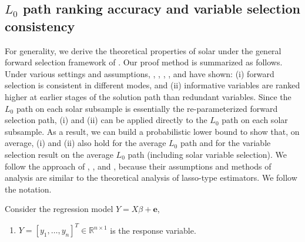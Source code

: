\documentclass[11pt,review,authoryear]{elsarticle}
\begin{document}
\begin{appendices}
\section{$L_0$ path ranking accuracy and variable selection consistency}

For generality, we derive the theoretical properties of solar under the general forward selection framework of \citet[Figure~1]{zhang09}. Our proof method is summarized as follows. Under various settings and assumptions, \citet{tropp2004greed}, \citet{yuan2007non}, \citet{wainwright2009sharp}, \citet{zhang09}, and \citet{ing2011stepwise} have shown: (i) forward selection is consistent in different modes, and (ii) informative variables are ranked higher at earlier stages of the solution path than redundant variables. Since the $L_0$ path on each solar subsample is essentially the re-parameterized forward selection path, (i) and (ii) can be applied directly to the $L_0$ path on each solar subsample. As a result, we can build a probabilistic lower bound to show that, on average, (i) and (ii) also hold for the average $L_0$ path and for the variable selection result on the average $L_0$ path (including solar variable selection). We follow the approach of \citet{tropp2004greed}, \citet{wainwright2009sharp}, and \citet{zhang09}, because their assumptions and methods of analysis are similar to the theoretical analysis of lasso-type estimators. We follow the \citet{zhang09} notation.

\begin{definition}
  Consider the regression model $Y = X\beta + \mathbf{e}$, \label{def:notation}
\end{definition}
%
\begin{enumerate}
  \item     $Y = \left[ y_1, \ldots, y_n \right]^T \in \mathbb{R}^{n \times 1}$ is the response variable.


\end{enumerate}
\end{appendices}
\end{document}
